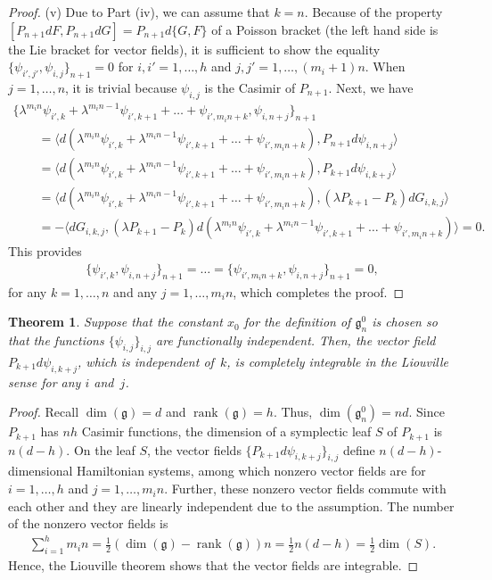 \documentclass[10pt,a4paper]{amsart}
\numberwithin{equation}{section}
\newtheorem{Theorem}{Theorem}[section]
\begin{document}
\begin{proof}
(v) Due to Part (iv), we can assume that $k=n$. Because of the property $[P_{n+1}dF, P_{n+1}dG] = P_{n+1}d\{ G,F\}$ of a Poisson bracket (the left hand side is the Lie bracket for vector f\/ields), it is suf\/f\/icient to show the equality $\{ \psi_{i',j'}, \psi_{i,j}\}_{n+1} = 0$ for $i,i' = 1,\dots ,h$ and $j,j' = 1,\dots ,(m_i+1)n$. When $j=1,\dots ,n$, it is trivial because $\psi_{i,j}$ is the Casimir of $P_{n+1}$. Next, we have
\begin{gather*}
 \{ \lambda ^{m_in}\psi_{i',k}+\lambda ^{m_in-1}\psi_{i',k+1} +\dots + \psi_{i', m_in+k}, \psi_{i,n+j} \}_{n+1} \\
\qquad{} = \langle d(\lambda ^{m_in}\psi_{i',k}+\lambda ^{m_in-1}\psi_{i',k+1} +\dots + \psi_{i', m_in+k}) ,
 P_{n+1}d\psi _{i,n+j} \rangle \\
\qquad{} = \langle d(\lambda ^{m_in}\psi_{i',k}+\lambda ^{m_in-1}\psi_{i',k+1} +\dots + \psi_{i', m_in+k}) ,
 P_{k+1}d\psi _{i,k+j} \rangle \\
\qquad{} = \langle d(\lambda ^{m_in}\psi_{i',k}+\lambda ^{m_in-1}\psi_{i',k+1} +\dots + \psi_{i', m_in+k}) ,
 (\lambda P_{k+1} - P_k)dG_{i,k,j} \rangle \\
\qquad{} = -\langle dG_{i,k,j} , (\lambda P_{k+1}-P_k)d(\lambda ^{m_in}\psi_{i',k}+\lambda ^{m_in-1}\psi_{i',k+1} +\dots + \psi_{i', m_in+k}) \rangle =0.
\end{gather*}
This provides
\begin{gather*}
\{ \psi_{i',k}, \psi_{i, n+j}\}_{n+1} = \dots = \{ \psi_{i',m_in+k}, \psi_{i, n+j}\}_{n+1} = 0,
\end{gather*}
for any $k=1,\dots ,n$ and any $j=1,\dots ,m_in$, which completes the proof.
\end{proof}

\begin{Theorem}\label{theorem2.4}
Suppose that the constant $x_0$ for the definition of $\mathfrak{g}^0_n$ is chosen so that the functions $\{ \psi_{i,j}\}_{i,j}$ are functionally independent. Then, the vector field $P_{k+1}d\psi_{i, k+j}$, which is independent of~$k$, is completely integrable in the Liouville sense for any $i$ and~$j$.
\end{Theorem}

\begin{proof} Recall $\dim (\mathfrak{g}) = d$ and $\operatorname{rank}(\mathfrak{g}) = h$. Thus, $\dim (\mathfrak{g}^0_n) = nd$. Since $P_{k+1}$ has $nh$ Casimir functions, the dimension of a symplectic leaf $S$ of $P_{k+1}$ is $n(d-h)$. On the leaf $S$, the vector f\/ields $\{ P_{k+1}d\psi_{i, k+j} \}_{i,j}$ def\/ine $n(d-h)$-dimensional Hamiltonian systems, among which nonzero vector f\/ields are for $i=1,\dots ,h$ and $j=1, \dots ,m_in$.
Further, these nonzero vector f\/ields commute with each other and they are linearly independent due to the assumption. The number of the nonzero vector f\/ields is
\begin{gather*}
\sum^h_{i=1}m_in = \frac{1}{2}(\dim (\mathfrak{g}) - \operatorname{rank}(\mathfrak{g}))n = \frac{1}{2}n (d-h) = \frac{1}{2} \dim (S).
\end{gather*}
Hence, the Liouville theorem shows that the vector f\/ields are integrable.
\end{proof}
\end{document}
